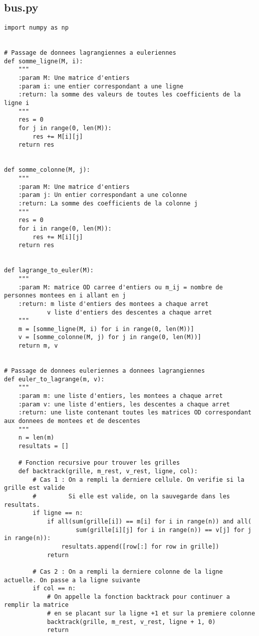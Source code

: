 \documentclass[12pt]{article}
\begin{document}
\subsection{bus.py}
\label{bus.py}
\begin{lstlisting}
import numpy as np


# Passage de donnees lagrangiennes a euleriennes
def somme_ligne(M, i):
    """
    :param M: Une matrice d'entiers
    :param i: une entier correspondant a une ligne
    :return: la somme des valeurs de toutes les coefficients de la ligne i
    """
    res = 0
    for j in range(0, len(M)):
        res += M[i][j]
    return res


def somme_colonne(M, j):
    """
    :param M: Une matrice d'entiers
    :param j: Un entier correspondant a une colonne
    :return: La somme des coefficients de la colonne j
    """
    res = 0
    for i in range(0, len(M)):
        res += M[i][j]
    return res


def lagrange_to_euler(M):
    """
    :param M: matrice OD carree d'entiers ou m_ij = nombre de personnes montees en i allant en j
    :return: m liste d'entiers des montees a chaque arret
            v liste d'entiers des descentes a chaque arret
    """
    m = [somme_ligne(M, i) for i in range(0, len(M))]
    v = [somme_colonne(M, j) for j in range(0, len(M))]
    return m, v


# Passage de donnees euleriennes a donnees lagrangiennes
def euler_to_lagrange(m, v):
    """
    :param m: une liste d'entiers, les montees a chaque arret
    :param v: une liste d'entiers, les descentes a chaque arret
    :return: une liste contenant toutes les matrices OD correspondant aux donnees de montees et de descentes
    """
    n = len(m)
    resultats = []

    # Fonction recursive pour trouver les grilles
    def backtrack(grille, m_rest, v_rest, ligne, col):
        # Cas 1 : On a rempli la derniere cellule. On verifie si la grille est valide
        #         Si elle est valide, on la sauvegarde dans les resultats.
        if ligne == n:
            if all(sum(grille[i]) == m[i] for i in range(n)) and all(
                    sum(grille[i][j] for i in range(n)) == v[j] for j in range(n)):
                resultats.append([row[:] for row in grille])
            return

        # Cas 2 : On a rempli la derniere colonne de la ligne actuelle. On passe a la ligne suivante
        if col == n:
            # On appelle la fonction backtrack pour continuer a remplir la matrice
            # en se placant sur la ligne +1 et sur la premiere colonne
            backtrack(grille, m_rest, v_rest, ligne + 1, 0)
            return


\end{lstlisting}
\end{document}
